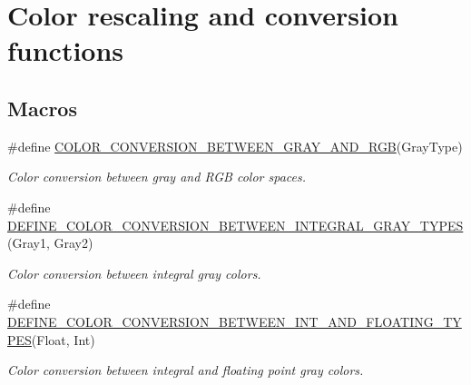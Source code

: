 \hypertarget{group___color_conversion}{\section{Color rescaling and conversion functions}
\label{group___color_conversion}
}
\subsection*{Macros}
\begin{DoxyCompactItemize}
\item 
\#define \hyperlink{group___color_conversion_gac0e4b5dd70b28feca22cc770d9862a8b}{C\-O\-L\-O\-R\-\_\-\-C\-O\-N\-V\-E\-R\-S\-I\-O\-N\-\_\-\-B\-E\-T\-W\-E\-E\-N\-\_\-\-G\-R\-A\-Y\-\_\-\-A\-N\-D\-\_\-\-R\-G\-B}(Gray\-Type)
\begin{DoxyCompactList}\small\item\em Color conversion between gray and R\-G\-B color spaces. \end{DoxyCompactList}\item 
\#define \hyperlink{group___color_conversion_gadcb0f8382525554854f5cb0ffa5ffeee}{D\-E\-F\-I\-N\-E\-\_\-\-C\-O\-L\-O\-R\-\_\-\-C\-O\-N\-V\-E\-R\-S\-I\-O\-N\-\_\-\-B\-E\-T\-W\-E\-E\-N\-\_\-\-I\-N\-T\-E\-G\-R\-A\-L\-\_\-\-G\-R\-A\-Y\-\_\-\-T\-Y\-P\-E\-S}(Gray1, Gray2)
\begin{DoxyCompactList}\small\item\em Color conversion between integral gray colors. \end{DoxyCompactList}\item 
\#define \hyperlink{group___color_conversion_gad00b96d2364bfb1473d0a12dbd5b26c5}{D\-E\-F\-I\-N\-E\-\_\-\-C\-O\-L\-O\-R\-\_\-\-C\-O\-N\-V\-E\-R\-S\-I\-O\-N\-\_\-\-B\-E\-T\-W\-E\-E\-N\-\_\-\-I\-N\-T\-\_\-\-A\-N\-D\-\_\-\-F\-L\-O\-A\-T\-I\-N\-G\-\_\-\-T\-Y\-P\-E\-S}(Float, Int)
\begin{DoxyCompactList}\small\item\em Color conversion between integral and floating point gray colors. \end{DoxyCompactList}\end{DoxyCompactItemize}
